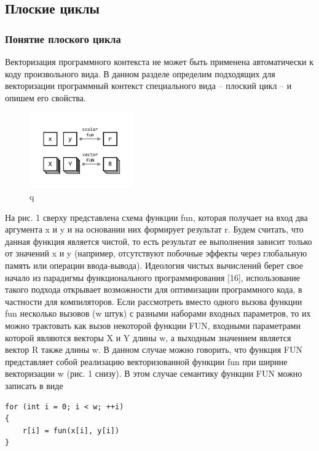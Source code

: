 \subsection{Плоские циклы}

\subsubsection{Понятие плоского цикла}

Векторизация программного контекста не может быть применена автоматически к коду произвольного вида.
В данном разделе определим подходящих для векторизации программный контекст специального вида -- плоский цикл -- и опишем его свойства.

\begin{figure}[ht]
\centering
\includegraphics[width=0.4\textwidth]{./pics/text_4_flat/fun.pdf}
\caption{q}
\label{lab}
\end{figure}

На рис. 1 сверху представлена схема функции fun, которая получает на вход два аргумента x и y и на основании них формирует результат r.
Будем считать, что данная функция является чистой, то есть результат ее выполнения зависит только от значений x и y (например, отсутствуют побочные эффекты через глобальную память или операции ввода-вывода).
Идеология чистых вычислений берет свое начало из парадигмы функционального программирования [16], использование такого подхода открывает возможности для оптимизации программного кода, в частности для компиляторов.
Если рассмотреть вместо одного вызова функции fun несколько вызовов (w штук) с разными наборами входных параметров, то их можно трактовать как вызов некоторой функции FUN, входными параметрами которой являются векторы X и Y длины w, а выходным значением является вектор R также длины w.
В данном случае можно говорить, что функция FUN представляет собой реализацию векторизованной функции fun при ширине векторизации w (рис. 1 снизу).
В этом случае семантику функции FUN можно записать в виде

\begin{lstlisting}[caption={caption},label={label}]
for (int i = 0; i < w; ++i)
{
    r[i] = fun(x[i], y[i])
}
\end{lstlisting}


